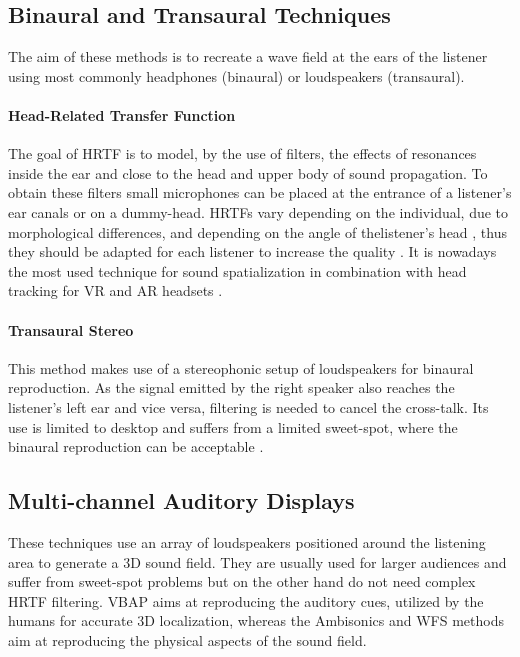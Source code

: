 \subsection{Binaural and Transaural Techniques}

The aim of these methods is to recreate a wave field at the ears of the listener using most commonly headphones (binaural) or loudspeakers (transaural).

\paragraph{Head-Related Transfer Function}\label{par:hrtf}
\hfill \break

The goal of \gls{HRTF} is to model, by the use of filters, the effects of resonances inside the ear and close to the head and upper body of sound propagation. To obtain these filters small microphones can be placed at the entrance of a listener's ear canals or on a dummy-head. \gls{HRTF}s vary depending on the individual, due to morphological differences, and depending on the angle of thelistener's head \cite{zhang2013measurement}, thus they should be adapted for each listener to increase the quality \cite{funkhouser2002sounds}. It is nowadays the most used technique for sound spatialization in combination with head tracking for \gls{VR} and \gls{AR} headsets \cite{bib:oculus, bib:hololens}. 

\paragraph{Transaural Stereo}\label{par:transaural}
\hfill \break

This method makes use of a stereophonic setup of loudspeakers for binaural reproduction. As the signal emitted by the right speaker also reaches the listener's left ear and vice versa, filtering is needed to cancel the cross-talk. Its use is limited to desktop and suffers from a limited sweet-spot, where the binaural reproduction can be acceptable \cite{funkhouser2002sounds}.

\subsection{Multi-channel Auditory Displays}

These techniques use an array of loudspeakers positioned around the listening area to generate a 3D sound field. They are usually used for larger audiences and suffer from sweet-spot problems but on the other hand do not need complex  \gls{HRTF} filtering. \gls{VBAP} aims at reproducing the auditory cues, utilized by the humans for accurate 3D localization, whereas the Ambisonics and \gls{WFS} methods aim at reproducing the physical aspects of the sound field. 

